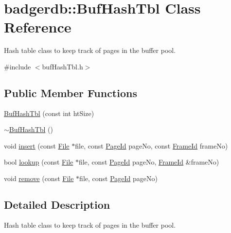 \hypertarget{classbadgerdb_1_1BufHashTbl}{\section{badgerdb\-:\-:Buf\-Hash\-Tbl Class Reference}
\label{classbadgerdb_1_1BufHashTbl}
}


Hash table class to keep track of pages in the buffer pool.  




{\ttfamily \#include $<$buf\-Hash\-Tbl.\-h$>$}

\subsection*{Public Member Functions}
\begin{DoxyCompactItemize}
\item 
\hyperlink{classbadgerdb_1_1BufHashTbl_a3928e864b3739c5772020c3eb3edec7c}{Buf\-Hash\-Tbl} (const int ht\-Size)
\item 
\hyperlink{classbadgerdb_1_1BufHashTbl_afc222773f09bf845230edb1702224ec6}{$\sim$\-Buf\-Hash\-Tbl} ()
\item 
void \hyperlink{classbadgerdb_1_1BufHashTbl_a92480d460ddb07e8b04ab7f99107e334}{insert} (const \hyperlink{classbadgerdb_1_1File}{File} $\ast$file, const \hyperlink{namespacebadgerdb_a1f49e404293bf4240756b89b53b1587a}{Page\-Id} page\-No, const \hyperlink{namespacebadgerdb_a1e7378fbefaea050a47e6cde929e9c01}{Frame\-Id} frame\-No)
\item 
bool \hyperlink{classbadgerdb_1_1BufHashTbl_a624a492b871319e8b10775601588db84}{lookup} (const \hyperlink{classbadgerdb_1_1File}{File} $\ast$file, const \hyperlink{namespacebadgerdb_a1f49e404293bf4240756b89b53b1587a}{Page\-Id} page\-No, \hyperlink{namespacebadgerdb_a1e7378fbefaea050a47e6cde929e9c01}{Frame\-Id} \&frame\-No)
\item 
void \hyperlink{classbadgerdb_1_1BufHashTbl_a5739cc2b22c74d62e25c9d3d316144d8}{remove} (const \hyperlink{classbadgerdb_1_1File}{File} $\ast$file, const \hyperlink{namespacebadgerdb_a1f49e404293bf4240756b89b53b1587a}{Page\-Id} page\-No)
\end{DoxyCompactItemize}


\subsection{Detailed Description}
Hash table class to keep track of pages in the buffer pool. 

